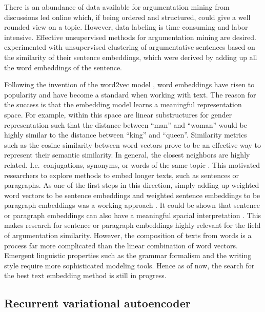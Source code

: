 \documentclass[11pt]{article}
\begin{document}
There is an abundance of data available for argumentation mining from discussions led online which,
if being ordered and structured, could give a well rounded view on a topic.
However, data labeling is time consuming and labor intensive.
Effective unsupervised methods for argumentation mining are desired.
\textcite{boltuvzic2015identifying} experimented with unsupervised clustering of argumentative sentences based on the similarity of their sentence embeddings,
which were derived by adding up all the word embeddings of the sentence.

Following the invention of the word2vec model \parencite{mikolov2013efficient}, word embeddings have risen to popularity and have become a standard when working with text.
The reason for the success is that the embedding model learns a meaningful representation space.
For example, within this space are linear substructures for gender representation such that the distance between ``man'' and ``woman'' would be highly similar to the distance between ``king'' and ``queen''.
Similarity metrics such as the cosine similarity between word vectors prove to be an effective way to represent their semantic similarity.
In general, the closest neighbors are highly related. I.e.\ conjugations, synonyms, or words of the same topic \parencite{pennington2014glove}.
This motivated researchers to explore methods to embed longer texts, such as sentences or paragraphs.
As one of the first steps in this direction, simply adding up weighted word vectors to be sentence embeddings and weighted sentence embeddings to be paragraph embeddings was a working approach \parencite{arora2016simple}.
It could be shown that sentence or paragraph embeddings can also have a meaningful spacial interpretation \parencite{dai2015document}.
This makes research for sentence or paragraph embeddings highly relevant for the field of argumentation similarity.
However, the composition of texts from words is a process far more complicated than the linear combination of word vectors.
Emergent linguistic properties such as the grammar formalism and the writing style require more sophisticated modeling tools.
Hence as of now, the search for the best text embedding method is still in progress.

\subsection{Recurrent variational autoencoder}\label{sec:recurr-vari-auto}
\end{document}

